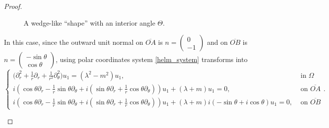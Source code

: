 \begin{proof}
\begin{enumerate}
\begin{figure}[H]
    \caption{A wedge-like ``shape'' with an interior angle \(\Theta\).}
    \label{wedge_dirac}
    \end{figure}
    In this case, since the outward unit normal on \(\overline{OA}\) is \(n =\begin{pmatrix}
        0\\
        -1
    \end{pmatrix}\) and on \(\overline{OB}\) is \(n =\begin{pmatrix}
        -\sin \theta\\
        \cos \theta
    \end{pmatrix}\), using polar coordinates system \eqref{helm_system} transforms into
    \begin{equation}\label{helm_polar_wedge}
        \begin{cases}
            \Big(\partial_r^2 + \frac{1}{r}\partial_r +\frac{1}{r^2}\partial_\theta^2 \Big)u_1 = (\lambda^2 - m^2)u_1, & \text{ in } \Omega\\
             i (\cos \theta\partial_r -\frac{1}{r}\sin \theta \partial_\theta + i(\sin \theta\partial_r +\frac{1}{r}\cos \theta \partial_\theta))u_1 + (\lambda + m)u_1 = 0, & \text{ on } \overline{OA}\\
             i (\cos \theta\partial_r -\frac{1}{r}\sin \theta \partial_\theta + i(\sin \theta\partial_r +\frac{1}{r}\cos \theta \partial_\theta))u_1 + (\lambda + m)i(-\sin \theta + i \cos \theta)u_1 = 0, & \text{ on } \overline{OB}
        \end{cases}.      
    \end{equation}


\end{enumerate}
\end{proof}
